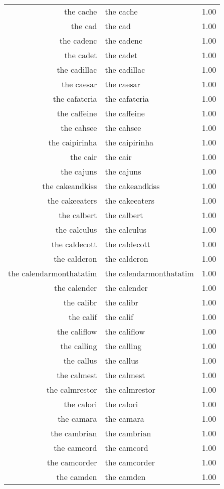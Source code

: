 \begin{table}[ht]
\begin{tabular}{rlr}
  the cache & the cache & 1.00 \\ 
  the cad & the cad & 1.00 \\ 
  the cadenc & the cadenc & 1.00 \\ 
  the cadet & the cadet & 1.00 \\ 
  the cadillac & the cadillac & 1.00 \\ 
  the caesar & the caesar & 1.00 \\ 
  the cafateria & the cafateria & 1.00 \\ 
  the caffeine & the caffeine & 1.00 \\ 
  the cahsee & the cahsee & 1.00 \\ 
  the caipirinha & the caipirinha & 1.00 \\ 
  the cair & the cair & 1.00 \\ 
  the cajuns & the cajuns & 1.00 \\ 
  the cakeandkiss & the cakeandkiss & 1.00 \\ 
  the cakeeaters & the cakeeaters & 1.00 \\ 
  the calbert & the calbert & 1.00 \\ 
  the calculus & the calculus & 1.00 \\ 
  the caldecott & the caldecott & 1.00 \\ 
  the calderon & the calderon & 1.00 \\ 
  the calendarmonthatatim & the calendarmonthatatim & 1.00 \\ 
  the calender & the calender & 1.00 \\ 
  the calibr & the calibr & 1.00 \\ 
  the calif & the calif & 1.00 \\ 
  the califlow & the califlow & 1.00 \\ 
  the calling & the calling & 1.00 \\ 
  the callus & the callus & 1.00 \\ 
  the calmest & the calmest & 1.00 \\ 
  the calmrestor & the calmrestor & 1.00 \\ 
  the calori & the calori & 1.00 \\ 
  the camara & the camara & 1.00 \\ 
  the cambrian & the cambrian & 1.00 \\ 
  the camcord & the camcord & 1.00 \\ 
  the camcorder & the camcorder & 1.00 \\ 
  the camden & the camden & 1.00 \\ 

\end{tabular}
\end{table}

